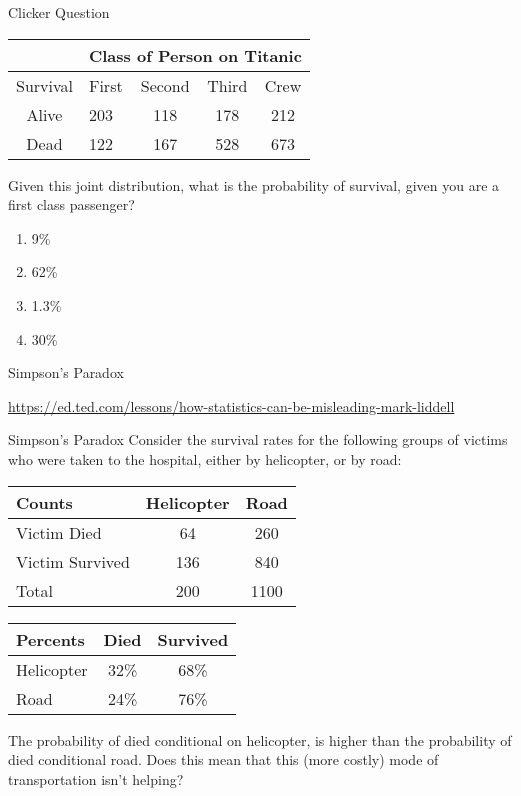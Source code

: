 \documentclass{beamer}
\begin{document}
\begin{frame}{Clicker Question} 
	\begin{center}
		\begin{tabular}{|c|l|c|c|c|}
			\hline 
			& \multicolumn{4}{c|}{{\color{blue}Class of Person on Titanic}}   \\ 
			\hline 
			{\color{blue}Survival} & First & Second & Third & Crew \\ 
			\hline 
			Alive                  & 203   & 118    & 178   & 212  \\ 
			\hline 
			Dead                   & 122   & 167    & 528   & 673  \\ 
			\hline 
		\end{tabular} 
	\end{center}
	
	Given this joint distribution, what is the probability of survival, given you are a first class passenger?
	\begin{enumerate}[label=(\alph*)]
		\item 9\%
		\item 62\%
		      \item1.3\%
		\item 30\%
	\end{enumerate}
\end{frame}

\begin{frame}{Simpson's Paradox}
	
	\url{https://ed.ted.com/lessons/how-statistics-can-be-misleading-mark-liddell}
	
\end{frame}

\begin{frame}{Simpson's Paradox}
	Consider the survival rates for the following groups of victims who were taken to the hospital, either by helicopter, or by road:
	
	{\footnotesize
	\begin{tabular}{|l|c|c|}
		\hline
		\textbf{Counts} & \textbf{Helicopter} & \textbf{Road} \\
		\hline \hline 
		Victim Died & 64 & 260 \\ \hline 
		Victim Survived & 136 & 840 \\ \hline 
		Total & 200 & 1100 \\ \hline 
	\end{tabular} 
	}
	{\footnotesize
	\begin{tabular}{|l|c|c|}
		\hline 
		\textbf{Percents} & \textbf{Died} & \textbf{Survived} \\ 
		\hline \hline
		Helicopter & 32\% & 68\% \\ \hline
		Road & 24\% & 76\% \\ \hline
	\end{tabular}
	}
	
	\vspace{5mm}
	The probability of died conditional on helicopter, is higher than the probability of died conditional road. Does this mean that this (more costly) mode of transportation isn't helping?
\end{frame}
\end{document}
